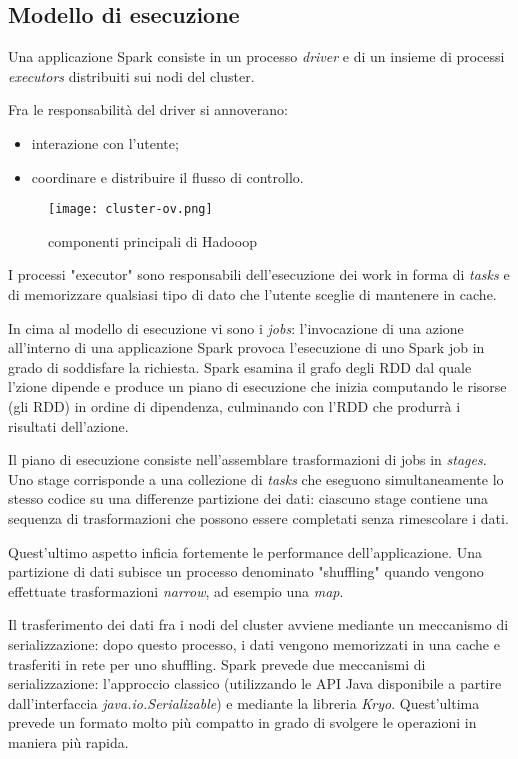 \subsection{Modello di esecuzione}
Una applicazione Spark consiste in un processo \textit{driver} e di un insieme di processi \textit{executors} distribuiti sui nodi del cluster.

Fra le responsabilità del driver si annoverano:
\begin{itemize}
\item interazione con l'utente;
\item coordinare e distribuire il flusso di controllo.
\end{itemize}


\begin{figure}[h]
\centering
\texttt{[image: cluster-ov.png]}
\caption{componenti principali di Hadooop}
\label{fig:hadoopComponets}
\end{figure} 
 
I processi "executor" sono responsabili dell'esecuzione dei work in forma di \textit{tasks} e di memorizzare qualsiasi tipo di dato che l'utente sceglie di mantenere in cache. 

In cima al modello di esecuzione vi sono i \textit{jobs}: l'invocazione di una azione all'interno di una applicazione Spark provoca l'esecuzione di uno Spark job in grado di soddisfare la richiesta. Spark esamina il grafo degli RDD dal quale l'zione dipende e produce un piano di esecuzione che inizia computando le risorse (gli RDD) in ordine di dipendenza, culminando con l'RDD che produrrà i risultati dell'azione.
 

Il piano di esecuzione consiste nell'assemblare trasformazioni di jobs in \textit{stages}. Uno stage corrisponde a una collezione di \textit{tasks} che eseguono simultaneamente lo stesso codice su una differenze partizione dei dati: ciascuno stage contiene una sequenza di trasformazioni che possono essere completati senza rimescolare i dati.

Quest'ultimo aspetto inficia fortemente le performance dell'applicazione. Una partizione di dati subisce un processo denominato "shuffling"  quando vengono effettuate trasformazioni \textit{narrow}, ad esempio una \textit{map}.

Il trasferimento dei dati fra i nodi del cluster avviene mediante un meccanismo di serializzazione: dopo questo processo, i dati vengono memorizzati in una cache e trasferiti in rete per uno shuffling. Spark prevede due meccanismi di serializzazione: l'approccio classico (utilizzando le API Java disponibile a partire dall'interfaccia \textit{java.io.Serializable}) e mediante la libreria \textit{Kryo}. Quest'ultima prevede un formato molto più compatto in grado di svolgere le operazioni in maniera più rapida.


